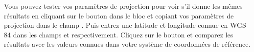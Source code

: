 Vous pouvez tester vos paramètres de projection pour voir s'il donne les mêmes
résultats en cliquant sur le bouton  dans le bloc 
 et copiant vos paramètres de projection dans le champ
. Puis entrez une latitude et longitude connue en WGS 84
dans les champs  et  respectivement. Cliquez sur
le bouton  et comparez les résultats avec les valeurs connues
dans votre système de coordonnées de référence.

